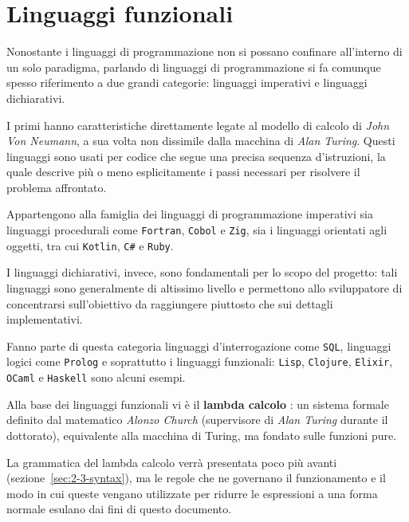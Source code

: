 \section{Linguaggi funzionali}
\label{sec:2-1-functional-languages}

Nonostante i linguaggi di programmazione non si possano confinare all'interno di un solo paradigma,
parlando di linguaggi di programmazione si fa comunque spesso riferimento a due grandi categorie:
linguaggi imperativi e linguaggi dichiarativi.


I primi hanno caratteristiche direttamente legate al modello di calcolo di \textit{John Von Neumann},
a sua volta non dissimile dalla macchina di \textit{Alan Turing}.
Questi linguaggi sono usati per codice che segue una precisa sequenza d'istruzioni,
la quale descrive più o meno esplicitamente i passi necessari per risolvere il problema affrontato.

\noindent Appartengono alla famiglia dei linguaggi di programmazione imperativi sia linguaggi procedurali come
\texttt{Fortran}, \texttt{Cobol} e \texttt{Zig}, sia i linguaggi orientati agli oggetti, tra cui \texttt{Kotlin}, \texttt{C\#} e \texttt{Ruby}.


I linguaggi dichiarativi, invece, sono fondamentali per lo scopo del progetto:
tali linguaggi sono generalmente di altissimo livello e permettono allo sviluppatore
di concentrarsi sull'obiettivo da raggiungere piuttosto che sui dettagli implementativi.

\noindent Fanno parte di questa categoria linguaggi d'interrogazione come \texttt{SQL},
linguaggi logici come \texttt{Prolog} e soprattutto i linguaggi funzionali:
\texttt{Lisp}, \texttt{Clojure}, \texttt{Elixir}, \texttt{OCaml} e \texttt{Haskell} sono alcuni esempi.


Alla base dei linguaggi funzionali vi è il \textbf{lambda calcolo} {\cite{Church-1932-FoundationLogic,Church-1933-FoundationLogic}}:
un sistema formale definito dal matematico \textit{Alonzo Church} (supervisore di \textit{Alan Turing} durante il dottorato),
equivalente alla macchina di Turing, ma fondato sulle funzioni pure.

\newpage

\noindent La grammatica del lambda calcolo verrà presentata poco più avanti (sezione~\ref{sec:2-3-syntax}),
ma le regole che ne governano il funzionamento e il modo in cui queste vengano utilizzate per ridurre
le espressioni a una forma normale esulano dai fini di questo documento.

